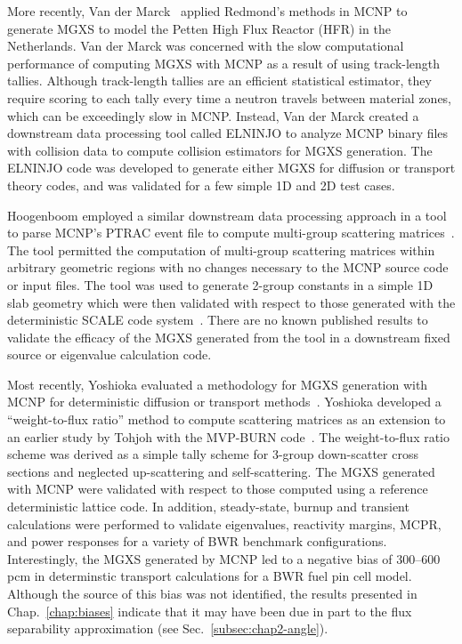 More recently, Van der Marck~\cite{van2006homogenized} applied Redmond's methods in MCNP to generate \ac{MGXS} to model the Petten High Flux Reactor (HFR) in the Netherlands. Van der Marck was concerned with the slow computational performance of computing \ac{MGXS} with MCNP as a result of using track-length tallies. Although track-length tallies are an efficient statistical estimator, they require scoring to each tally every time a neutron travels between material zones, which can be exceedingly slow in MCNP. Instead, Van der Marck created a downstream data processing tool called ELNINJO to analyze MCNP binary files with collision data to compute collision estimators for \ac{MGXS} generation. The ELNINJO code was developed to generate either \ac{MGXS} for diffusion or transport theory codes, and was validated for a few simple 1D and 2D test cases.

Hoogenboom employed a similar downstream data processing approach in a tool to parse MCNP's PTRAC event file to compute multi-group scattering matrices~\cite{hoogenboom2007generation}. The tool permitted the computation of multi-group scattering matrices within arbitrary geometric regions with no changes necessary to the MCNP source code or input files. The tool was used to generate 2-group constants in a simple 1D slab geometry which were then validated with respect to those generated with the deterministic SCALE code system~\cite{bucholz1982scale}. There are no known published results to validate the efficacy of the \ac{MGXS} generated from the tool in a downstream fixed source or eigenvalue calculation code.

Most recently, Yoshioka evaluated a methodology for \ac{MGXS} generation with MCNP for deterministic diffusion or transport methods~\cite{yoshioka2010multigroup, yoshioka2011multi}. Yoshioka developed a ``weight-to-flux ratio'' method to compute scattering matrices as an extension to an earlier study by Tohjoh with the MVP-BURN code~\cite{tohjoh2005application}. The weight-to-flux ratio scheme was derived as a simple tally scheme for 3-group down-scatter cross sections and neglected up-scattering and self-scattering. The \ac{MGXS} generated with MCNP were validated with respect to those computed using a reference deterministic lattice code. In addition, steady-state, burnup and transient calculations were performed to validate eigenvalues, reactivity margins, \ac{MCPR}, and power responses for a variety of \ac{BWR} benchmark configurations. Interestingly, the \ac{MGXS} generated by MCNP led to a negative bias of 300--600 \ac{pcm} in determinstic transport calculations for a \ac{BWR} fuel pin cell model. Although the source of this bias was not identified, the results presented in Chap.~\ref{chap:biases} indicate that it may have been due in part to the flux separability approximation (see Sec.~\ref{subsec:chap2-angle}).

